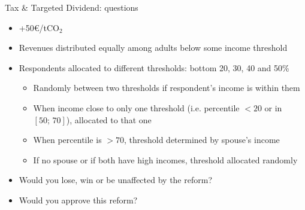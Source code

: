 \documentclass[aspectratio=169,9pt,dvipsnames]{beamer}
\begin{document}







     \begin{frame}{Tax \& Targeted Dividend: questions}\label{income_origin}

\begin{itemize} %
    \item +50\euro{}/tCO$_\text{2}$
    \item Revenues distributed equally among adults below some income threshold
    \item Respondents allocated to different thresholds: bottom 20, 30, 40 and 50\%
    \begin{itemize}
        \item Randomly between two thresholds if respondent's income is within them
        \item When income close to only one threshold (i.e. percentile $<20$ or in $\left[50;\,70\right]$), allocated to that one 
        \item When percentile is $>70$, threshold determined by spouse's income
        \item If no spouse or if both have high incomes, threshold allocated randomly
    \end{itemize}    
    \item Would you lose, win or be unaffected by the reform?
    \item Would you approve this reform?
\end{itemize}
\medskip 
\hyperlink{income_target}{}
    \end{frame}
\end{document}
